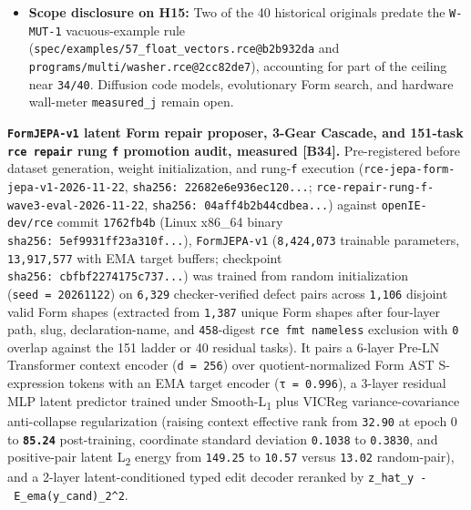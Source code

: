 \documentclass[10pt,letterpaper]{article}
\begin{document}
\begin{itemize}
  \texttt{16,\allowbreak{}457.\allowbreak{}9\ J} to \texttt{10,\allowbreak{}553.\allowbreak{}5\ J}) for local
  \texttt{Qwen\ 3.6}.
\item
  \textbf{Scope disclosure on H15:} Two of the 40 historical originals
  predate the \texttt{W-MUT-1} vacuous-example rule
  (\texttt{spec/\allowbreak{}examples/\allowbreak{}57\_\allowbreak{}float\_\allowbreak{}vectors.\allowbreak{}rce@b2b932da} and
  \texttt{programs/\allowbreak{}multi/\allowbreak{}washer.\allowbreak{}rce@2cc82de7}), accounting for part of
  the ceiling near \texttt{34/40}. Diffusion code models, evolutionary
  Form search, and hardware wall-meter \texttt{measured\_\allowbreak{}j} remain open.
\end{itemize}

\textbf{\texttt{FormJEPA-\allowbreak{}v1} latent Form repair proposer, 3-Gear
Cascade, and 151-task \texttt{rce\ repair} rung \texttt{f} promotion
audit, measured {[}B34{]}.} Pre-registered before dataset generation,
weight initialization, and rung-\texttt{f} execution
(\texttt{rce-\allowbreak{}jepa-\allowbreak{}form-\allowbreak{}jepa-\allowbreak{}v1-\allowbreak{}2026-\allowbreak{}11-\allowbreak{}22},
\texttt{sha256:\ 22682e6e\allowbreak{}936ec120.\allowbreak{}.\allowbreak{}.\allowbreak{}};
\texttt{rce-\allowbreak{}repair-\allowbreak{}rung-\allowbreak{}f-\allowbreak{}wave3-\allowbreak{}eval-\allowbreak{}2026-\allowbreak{}11-\allowbreak{}22},
\texttt{sha256:\ 04aff4b2\allowbreak{}b44cdbea.\allowbreak{}.\allowbreak{}.\allowbreak{}}) against \texttt{openIE-\allowbreak{}dev/\allowbreak{}rce}
commit \texttt{1762fb4b} (Linux x86\_64 binary
\texttt{sha256:\ 5ef9931f\allowbreak{}f23a310f.\allowbreak{}.\allowbreak{}.\allowbreak{}}), \texttt{FormJEPA-\allowbreak{}v1}
(\texttt{8,424,073} trainable parameters, \texttt{13,\allowbreak{}917,\allowbreak{}577} with EMA
target buffers; checkpoint \texttt{sha256:\ cbfbf227\allowbreak{}4175c737.\allowbreak{}.\allowbreak{}.\allowbreak{}}) was
trained from random initialization (\texttt{seed\ =\ 20261122}) on
\texttt{6,329} checker-verified defect pairs across \texttt{1,106}
disjoint valid Form shapes (extracted from \texttt{1,387} unique Form
shapes after four-layer path, slug, declaration-name, and
\texttt{458}-digest \texttt{rce\ fmt\ nameless} exclusion with
\texttt{0} overlap against the 151 ladder or 40 residual tasks). It
pairs a 6-layer Pre-LN Transformer context encoder (\texttt{d\ =\ 256})
over quotient-normalized Form AST S-expression tokens with an EMA target
encoder (\texttt{τ\ =\ 0.\allowbreak{}996}), a 3-layer residual MLP latent predictor
trained under Smooth-L\textsubscript{1} plus VICReg variance-covariance
anti-collapse regularization (raising context effective rank from
\texttt{32.90} at epoch 0 to \textbf{\texttt{85.24}} post-training,
coordinate standard deviation \texttt{0.1038} to \texttt{0.3830}, and
positive-pair latent L\textsubscript{2} energy from \texttt{149.25} to
\texttt{10.57} versus \texttt{13.02} random-pair), and a 2-layer
latent-conditioned typed edit decoder reranked by
\texttt{\textbar{}\textbar{}z\_hat\_y\ -\ E\_ema(y\_cand)\textbar{}\textbar{}\_2\^{}2}.
\end{document}
